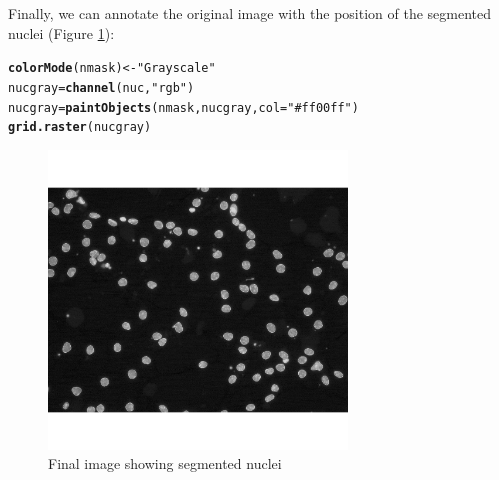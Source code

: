\documentclass{article}\usepackage[]{graphicx}\usepackage[]{color}
\makeatletter
\newcommand{\hlstr}[1]{\textcolor[rgb]{0.192,0.494,0.8}{#1}}%
\newcommand{\hlstd}[1]{\textcolor[rgb]{0.345,0.345,0.345}{#1}}%
\newcommand{\hlkwb}[1]{\textcolor[rgb]{0.69,0.353,0.396}{#1}}%
\newcommand{\hlkwc}[1]{\textcolor[rgb]{0.333,0.667,0.333}{#1}}%
\newcommand{\hlkwd}[1]{\textcolor[rgb]{0.737,0.353,0.396}{\textbf{#1}}}%
\newenvironment{kframe}{%
 \def\at@end@of@kframe{}%
 \ifinner\ifhmode%
  \def\at@end@of@kframe{\end{minipage}}%
  \begin{minipage}{\columnwidth}%
 \fi\fi%
 \def\FrameCommand##1{\hskip\@totalleftmargin \hskip-\fboxsep
 \colorbox{shadecolor}{##1}\hskip-\fboxsep
     \hskip-\linewidth \hskip-\@totalleftmargin \hskip\columnwidth}%
 \MakeFramed {\advance\hsize-\width
   \@totalleftmargin\z@ \linewidth\hsize
   \@setminipage}}%
 {\par\unskip\endMakeFramed%
 \at@end@of@kframe}
\newenvironment{knitrout}{}{} %
\makeatother
\begin{document}
Finally, we can annotate the original image with the position of the segmented nuclei (Figure \ref{fig:nucgray}):
\begin{knitrout}
\color{fgcolor}\begin{kframe}
\begin{alltt}
\hlkwd{colorMode}\hlstd{(nmask)} \hlkwb{<-} \hlstr{"Grayscale"}
\hlstd{nucgray} \hlkwb{=} \hlkwd{channel}\hlstd{(nuc,} \hlstr{"rgb"}\hlstd{)}
\hlstd{nucgray} \hlkwb{=} \hlkwd{paintObjects}\hlstd{(nmask, nucgray,} \hlkwc{col}\hlstd{=}\hlstr{"#ff00ff"}\hlstd{)}
\hlkwd{grid.raster}\hlstd{(nucgray)}
\end{alltt}
\end{kframe}\begin{figure}

{\centering \includegraphics[width=300px]{knit_figure/fignucgray-1} 

}

\caption[Final image showing segmented nuclei]{Final image showing segmented nuclei\label{fig:nucgray}}
\end{figure}


\end{knitrout}
\end{document}
